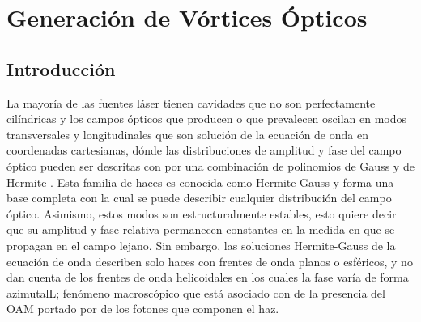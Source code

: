 \chapter{Generación de Vórtices Ópticos}
\label{sec:OV_gen}
\label{sec:ChGV_Caracterizacion_de_SLM}
\section{Introducción}
La mayoría de las fuentes láser tienen cavidades que no son
perfectamente cilíndricas y los campos ópticos que producen o que
prevalecen oscilan en
modos transversales y longitudinales que son solución de la ecuación
de onda en coordenadas cartesianas, dónde las distribuciones de amplitud y fase
del campo óptico pueden ser descritas con por una
combinación de polinomios de Gauss y de Hermite
. Esta familia de haces es conocida como
Hermite-Gauss y forma una base completa con la cual se puede describir
cualquier distribución del campo óptico. Asimismo, estos modos son
estructuralmente estables, esto quiere decir que su amplitud y fase
relativa permanecen constantes en la medida en que se propagan en el
campo lejano. Sin embargo, las soluciones Hermite-Gauss de la ecuación de onda
describen solo haces con frentes de onda planos o esféricos, y no dan
cuenta de los frentes de onda helicoidales en los cuales la fase varía
de forma azimutalL; fenómeno macroscópico que está asociado con de la
presencia del \acrshort{OAM} portado por de los fotones que componen
el haz.

